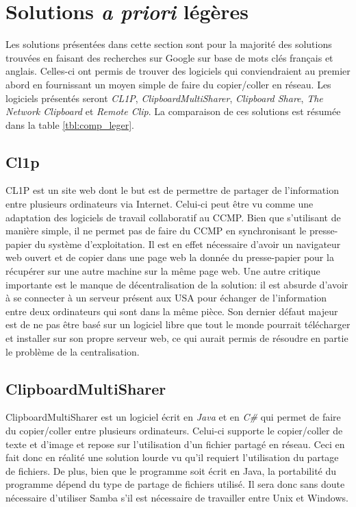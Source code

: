 \section{Solutions \emph{a priori} légères}
Les solutions présentées dans cette section sont pour la majorité des
solutions trouvées en faisant des recherches sur Google sur base
de mots clés français et anglais. Celles-ci ont permis de trouver des
logiciels qui conviendraient au premier abord en fournissant un moyen
simple de faire du copier/coller en réseau. Les logiciels présentés seront
\emph{CL1P}, \emph{ClipboardMultiSharer}, \emph{Clipboard Share},
\emph{The Network Clipboard} et \emph{Remote Clip}.
La comparaison de ces solutions est résumée dans la table \ref{tbl:comp_leger}.

\subsection{Cl1p}
CL1P\cite{cl1p} est un site web dont le but est de permettre de partager
de l'information entre plusieurs ordinateurs via Internet. Celui-ci
peut être vu comme une adaptation des logiciels de travail collaboratif au
CCMP. Bien que s'utilisant de manière simple, il ne permet pas de faire du
CCMP en synchronisant le presse-papier du système d'exploitation. Il est en
effet nécessaire d'avoir un navigateur web ouvert et de copier dans une page
web la donnée du presse-papier pour la récupérer sur une autre machine
sur la même page web. Une autre critique importante est le manque de
décentralisation de la solution: il est absurde d'avoir à se connecter à un
serveur présent aux USA pour échanger de l'information entre deux
ordinateurs qui sont dans la même pièce. Son dernier défaut majeur est de
ne pas être basé sur un logiciel libre que tout le monde pourrait télécharger
et installer sur son propre serveur web, ce qui aurait permis de résoudre
en partie le problème de la centralisation.

\subsection{ClipboardMultiSharer}
ClipboardMultiSharer \cite{clipmsharer} est un logiciel écrit en \emph{Java}
et en \emph{C\#} qui permet de faire du copier/coller entre plusieurs
ordinateurs. Celui-ci supporte le copier/coller de texte et d'image et repose
sur l'utilisation d'un fichier partagé en réseau. Ceci en fait donc en réalité
une solution lourde vu qu'il requiert l'utilisation du partage de fichiers.
De plus, bien que le programme soit écrit en Java, la portabilité du programme
dépend du type de partage de fichiers utilisé. Il sera donc sans doute
nécessaire d'utiliser Samba s'il est nécessaire de travailler entre Unix
et Windows.

